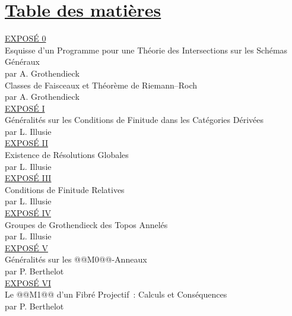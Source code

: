 \section*{\underline{Table des matières}}

\noindent
\underline{EXPOSÉ 0}\\
Esquisse d'un Programme pour une Théorie des Intersections sur les Schémas Généraux\\
par A. Grothendieck \\[8pt]
Classes de Faisceaux et Théorème de Riemann--Roch\\
par A. Grothendieck \\[8pt]
\underline{EXPOSÉ I}\\
Généralités sur les Conditions de Finitude dans les Catégories Dérivées\\
par L. Illusie \\[8pt]
\underline{EXPOSÉ II}\\
Existence de Résolutions Globales\\
par L. Illusie \\[8pt]
\underline{EXPOSÉ III}\\
Conditions de Finitude Relatives\\
par L. Illusie \\[8pt]
\underline{EXPOSÉ IV}\\
Groupes de Grothendieck des Topos Annelés\\
par L. Illusie \\[8pt]
\underline{EXPOSÉ V}\\
Généralités sur les @@M0@@-Anneaux\\
par P. Berthelot \\[8pt]
\underline{EXPOSÉ VI}\\
Le @@M1@@ d'un Fibré Projectif~: Calculs et Conséquences\\
par P. Berthelot \\[8pt]
